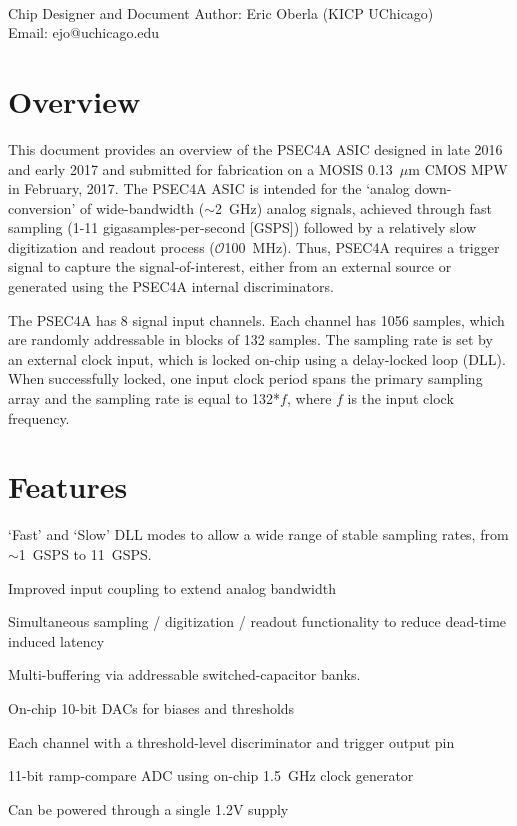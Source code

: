 \documentclass[12pt]{article}
\begin{document}
 \\
\noindent Chip Designer and Document Author: Eric Oberla (KICP UChicago) \\
\noindent Email: ejo@uchicago.edu


\section*{Overview}
\begin{multicols}{2}

  This document provides an overview of the PSEC4A ASIC designed in late 2016 and early 2017 and submitted for fabrication on a MOSIS 0.13~$\mu$m CMOS MPW in February, 2017. The PSEC4A ASIC is intended for the `analog down-conversion' of wide-bandwidth ($\sim$2~GHz) analog signals, achieved through fast sampling (1-11 gigasamples-per-second [GSPS]) followed by a relatively slow digitization and readout process ($\mathcal{O}$100~MHz). Thus, PSEC4A requires a trigger signal to capture the signal-of-interest, either from an external source or generated using the PSEC4A internal discriminators.

  The PSEC4A has 8 signal input channels. Each channel has 1056 samples, which are randomly addressable in blocks of 132 samples. The sampling rate is set by an external clock input, which is locked on-chip using a delay-locked loop (DLL). When successfully locked, one input clock period spans the primary sampling array and the sampling rate is equal to 132*$f$, where $f$ is the input clock frequency.
  
\end{multicols}

\section*{Features}
\begin{itemize}
{\bf
  \item `Fast' and `Slow' DLL modes to allow a wide range of stable sampling rates, from $\sim$1~GSPS to 11~GSPS.
  \item Improved input coupling to extend analog bandwidth
  \item Simultaneous sampling / digitization / readout functionality to reduce dead-time induced latency
  \item Multi-buffering via addressable switched-capacitor banks.
  \item On-chip 10-bit DACs for biases and thresholds
  \item Each channel with a threshold-level discriminator and trigger output pin
  \item 11-bit ramp-compare ADC using on-chip 1.5~GHz clock generator
  \item Can be powered through a single 1.2V supply
}

    
\end{itemize}
\end{document}
